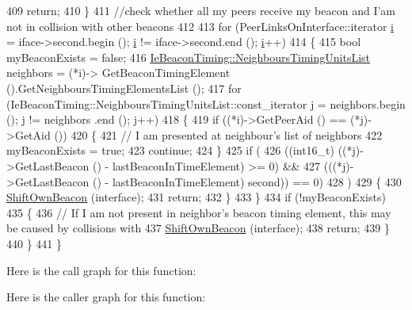 \begin{DoxyCode}
409       \textcolor{keywordflow}{return};
410     \}
411   \textcolor{comment}{//check whether all my peers receive my beacon and I'am not in collision with other beacons}
412 
413   \textcolor{keywordflow}{for} (PeerLinksOnInterface::iterator \hyperlink{bernuolliDistribution_8m_a6f6ccfcf58b31cb6412107d9d5281426}{i} = iface->second.begin (); \hyperlink{bernuolliDistribution_8m_a6f6ccfcf58b31cb6412107d9d5281426}{i} != iface->second.end (); 
      \hyperlink{bernuolliDistribution_8m_a6f6ccfcf58b31cb6412107d9d5281426}{i}++)
414     \{
415       \textcolor{keywordtype}{bool} myBeaconExists = \textcolor{keyword}{false};
416       \hyperlink{group__dot11s_ga8dbec40aea7e1014f0af23de3b31a78c}{IeBeaconTiming::NeighboursTimingUnitsList} neighbors = (*i)->
      GetBeaconTimingElement ().GetNeighboursTimingElementsList ();
417       \textcolor{keywordflow}{for} (IeBeaconTiming::NeighboursTimingUnitsList::const\_iterator j = neighbors.begin (); j != neighbors
      .end (); j++)
418         \{
419           \textcolor{keywordflow}{if} ((*i)->GetPeerAid () == (*j)->GetAid ())
420             \{
421               \textcolor{comment}{// I am presented at neighbour's list of neighbors}
422               myBeaconExists = \textcolor{keyword}{true};
423               \textcolor{keywordflow}{continue};
424             \}
425           \textcolor{keywordflow}{if} (
426             ((int16\_t) ((*j)->GetLastBeacon () - lastBeaconInTimeElement) >= 0) &&
427             (((*j)->GetLastBeacon () - lastBeaconInTimeElement) %
      second)) == 0)
428             )
429             \{
430               \hyperlink{classns3_1_1dot11s_1_1PeerManagementProtocol_a9649a96c629c63b98c133fe258340aa9}{ShiftOwnBeacon} (interface);
431               \textcolor{keywordflow}{return};
432             \}
433         \}
434       \textcolor{keywordflow}{if} (!myBeaconExists)
435         \{
436           \textcolor{comment}{// If I am not present in neighbor's beacon timing element, this may be caused by collisions with}
437           \hyperlink{classns3_1_1dot11s_1_1PeerManagementProtocol_a9649a96c629c63b98c133fe258340aa9}{ShiftOwnBeacon} (interface);
438           \textcolor{keywordflow}{return};
439         \}
440     \}
441 \}
\end{DoxyCode}


Here is the call graph for this function\+:




Here is the caller graph for this function\+:


